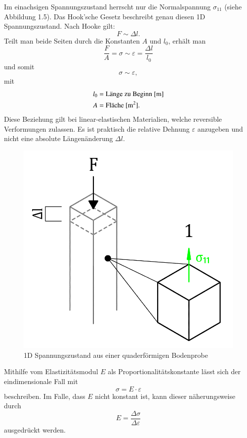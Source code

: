 Im einachsigen Spannungszustand herrscht nur die Normalspannung $\sigma_{11}$ (siehe Abbildung 1.5).
Das Hook'sche Gesetz beschreibt genau diesen 1D Spannungszustand.
Nach Hooke gilt:
\[
F
\sim
\Delta l
.
\]
Teilt man beide Seiten durch die Konstanten $A$ und $l_0$, erhält man
\[
\frac{F}{A}
=
\sigma
\sim
\varepsilon
=
\frac{\Delta l}{l_0}
\]
und somit
\[
\sigma
\sim
\varepsilon
,
\]
mit
\begin{align*}
	l_0 &= \text{Länge zu Beginn [\si{\meter}]} \\
	  A &= \text{Fläche [\si{\meter\squared}].}
\end{align*}
Diese Beziehung gilt bei linear-elastischen Materialien, welche reversible Verformungen zulassen.
Es ist praktisch die relative Dehnung $\varepsilon$ anzugeben und nicht eine absolute Längenänderung $\Delta l$.
\begin{figure}
	\centering
	\includegraphics[width=0.35\linewidth,keepaspectratio]{papers/spannung/Grafiken/Bild1.png}
	\caption{1D Spannungszustand aus einer quaderförmigen Bodenprobe}
	\label{fig:Bild1}
\end{figure}
Mithilfe vom Elastizitätsmodul $E$ als Proportionalitätskonstante lässt sich der eindimensionale Fall mit
\[
\sigma
=
E\cdot\varepsilon
\]
beschreiben.
Im Falle, dass $E$ nicht konstant ist, kann dieser näherungsweise durch
\[
E
=
\frac{\Delta\sigma}{\Delta\varepsilon}
\]
ausgedrückt werden.